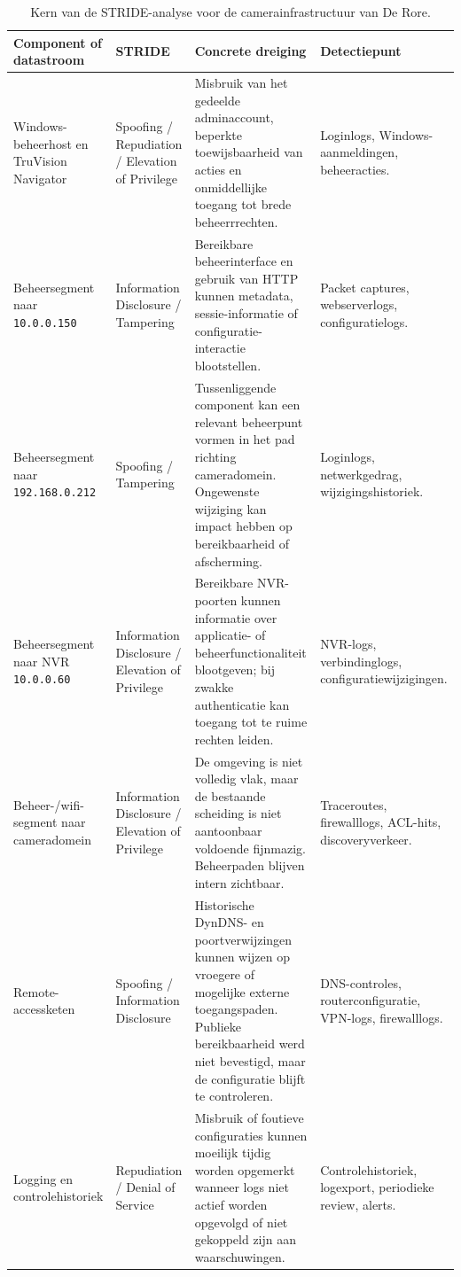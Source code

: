 \begin{table}[htbp]
    \centering
    \scriptsize
    \renewcommand{\arraystretch}{1.2}
    \caption[Kern van de STRIDE-analyse]{Kern van de STRIDE-analyse voor de camerainfrastructuur van De Rore.}
    \label{tab:stride-kernanalyse}
    \begin{tabular}{p{}p{}p{}p{}}
        \hline
        \textbf{Component of datastroom} & \textbf{STRIDE} & \textbf{Concrete dreiging} & \textbf{Detectiepunt} \\
        \hline
        Windows-beheerhost en TruVision Navigator & Spoofing / Repudiation / Elevation of Privilege & Misbruik van het gedeelde adminaccount, beperkte toewijsbaarheid van acties en onmiddellijke toegang tot brede beheerrrechten. & Loginlogs, Windows-aanmeldingen, beheeracties. \\
        \hline
        Beheersegment naar \texttt{10.0.0.150} & Information Disclosure / Tampering & Bereikbare beheerinterface en gebruik van HTTP kunnen metadata, sessie-informatie of configuratie-interactie blootstellen. & Packet captures, webserverlogs, configuratielogs. \\
        \hline
        Beheersegment naar \texttt{192.168.0.212} & Spoofing / Tampering & Tussenliggende component kan een relevant beheerpunt vormen in het pad richting cameradomein. Ongewenste wijziging kan impact hebben op bereikbaarheid of afscherming. & Loginlogs, netwerkgedrag, wijzigingshistoriek. \\
        \hline
        Beheersegment naar NVR \texttt{10.0.0.60} & Information Disclosure / Elevation of Privilege & Bereikbare NVR-poorten kunnen informatie over applicatie- of beheerfunctionaliteit blootgeven; bij zwakke authenticatie kan toegang tot te ruime rechten leiden. & NVR-logs, verbindinglogs, configuratiewijzigingen. \\
        \hline
        Beheer-/wifi-segment naar cameradomein & Information Disclosure / Elevation of Privilege & De omgeving is niet volledig vlak, maar de bestaande scheiding is niet aantoonbaar voldoende fijnmazig. Beheerpaden blijven intern zichtbaar. & Traceroutes, firewalllogs, ACL-hits, discoveryverkeer. \\
        \hline
        Remote-accessketen & Spoofing / Information Disclosure & Historische DynDNS- en poortverwijzingen kunnen wijzen op vroegere of mogelijke externe toegangspaden. Publieke bereikbaarheid werd niet bevestigd, maar de configuratie blijft te controleren. & DNS-controles, routerconfiguratie, VPN-logs, firewalllogs. \\
        \hline
        Logging en controlehistoriek & Repudiation / Denial of Service & Misbruik of foutieve configuraties kunnen moeilijk tijdig worden opgemerkt wanneer logs niet actief worden opgevolgd of niet gekoppeld zijn aan waarschuwingen. & Controlehistoriek, logexport, periodieke review, alerts. \\
        \hline
    \end{tabular}
\end{table}

